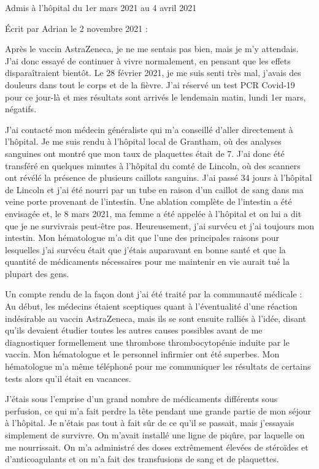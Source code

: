 Admis à l'hôpital du 1er mars 2021 au 4 avril 2021

Écrit par Adrian le 2 novembre 2021 :

Après le vaccin AstraZeneca, je ne me sentais pas bien, mais je m'y
attendais. J'ai donc essayé de continuer à vivre normalement, en pensant que les
effets disparaîtraient bientôt. Le 28 février 2021, je me suis senti très mal,
j'avais des douleurs dans tout le corps et de la fièvre. J'ai réservé un test
PCR Covid-19 pour ce jour-là et mes résultats sont arrivés le lendemain matin,
lundi 1er mars, négatifs.

J'ai contacté mon médecin généraliste qui m'a conseillé d'aller directement à
l'hôpital. Je me suis rendu à l'hôpital local de Grantham, où des analyses
sanguines ont montré que mon taux de plaquettes était de 7. J'ai donc été
transféré en quelques minutes à l'hôpital du comté de Lincoln, où des scanners
ont révélé la présence de plusieurs caillots sanguins. J'ai passé 34 jours à
l'hôpital de Lincoln et j'ai été nourri par un tube en raison d'un caillot de
sang dans ma veine porte provenant de l'intestin. Une ablation complète de
l'intestin a été envisagée et, le 8 mars 2021, ma femme a été appelée à
l'hôpital et on lui a dit que je ne survivrais peut-être pas. Heureusement, j'ai
survécu et j'ai toujours mon intestin. Mon hématologue m'a dit que l'une des
principales raisons pour lesquelles j'ai survécu était que j'étais auparavant en
bonne santé et que la quantité de médicaments nécessaires pour me maintenir en
vie aurait tué la plupart des gens.

Un compte rendu de la façon dont j'ai été traité par la communauté médicale : Au
début, les médecins étaient sceptiques quant à l'éventualité d'une réaction
indésirable au vaccin AstraZeneca, mais ils se sont ensuite ralliés à l'idée,
disant qu'ils devaient étudier toutes les autres causes possibles avant de me
diagnostiquer formellement une thrombose thrombocytopénie induite par le
vaccin. Mon hématologue et le personnel infirmier ont été superbes. Mon
hématologue m'a même téléphoné pour me communiquer les résultats de certains
tests alors qu'il était en vacances.

J'étais sous l'emprise d'un grand nombre de médicaments différents sous
perfusion, ce qui m'a fait perdre la tête pendant une grande partie de mon
séjour à l'hôpital. Je n'étais pas tout à fait sûr de ce qu'il se passait, mais
j'essayais simplement de survivre. On m'avait installé une ligne de piqûre, par
laquelle on me nourrissait. On m'a administré des doses extrêmement élevées de
stéroïdes et d'anticoagulants et on m'a fait des transfusions de sang et de
plaquettes.

